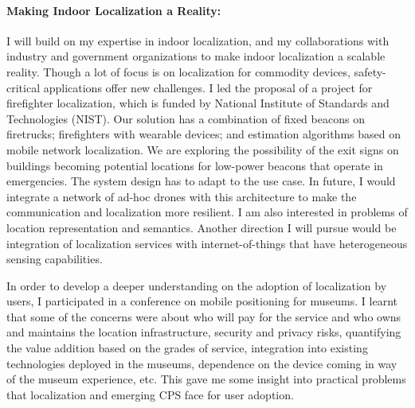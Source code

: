 \documentclass[10pt]{article}
\begin{document}
\paragraph{Making Indoor Localization a Reality: }
I will build on my expertise in indoor localization, and my collaborations with industry and government organizations to make indoor localization a scalable reality. Though a lot of focus is on localization for commodity devices, safety-critical applications offer new challenges. I led the proposal of a project for firefighter localization, which is funded by National Institute of Standards and Technologies (NIST). %
Our solution has a combination of fixed beacons on firetrucks; firefighters with wearable devices; and estimation algorithms based on mobile network localization. We are exploring the possibility of the exit signs on buildings becoming potential locations for low-power beacons that operate in emergencies. The system design has to adapt to the use case. In future, I would integrate a network of ad-hoc drones with this architecture to make the communication and localization more resilient. I am also interested in problems of location representation and semantics.  Another direction I will pursue would be integration of localization services with internet-of-things  that have heterogeneous sensing capabilities. %

In order to develop a deeper understanding on the adoption of localization by users, I participated in a conference on mobile positioning for museums. %
I learnt that some of the concerns were about  who will pay for the service and who owns and maintains the location infrastructure, security and privacy risks, quantifying the value addition based on the grades of service, integration into existing technologies deployed in the museums, dependence on the device coming in way of the museum experience, etc. This gave me some insight into practical problems that localization and emerging CPS face for user adoption.
\end{document}
